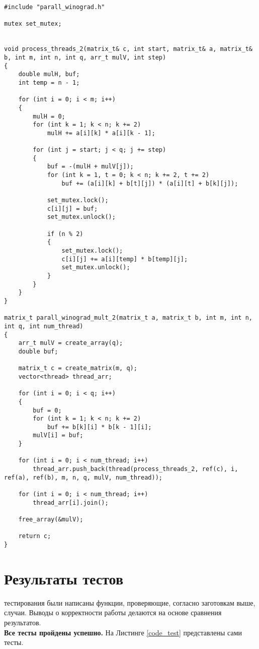 \begin{lstlisting}[label=code3, caption = Распараллеленный алгоритм Винограда (2 вариант), captionpos=b]
#include "parall_winograd.h"

mutex set_mutex;


void process_threads_2(matrix_t& c, int start, matrix_t& a, matrix_t& b, int m, int n, int q, arr_t mulV, int step)
{
	double mulH, buf;
	int temp = n - 1;
	
	for (int i = 0; i < m; i++)
	{
		mulH = 0;
		for (int k = 1; k < n; k += 2)
			mulH += a[i][k] * a[i][k - 1];
		
		for (int j = start; j < q; j += step)
		{
			buf = -(mulH + mulV[j]);
			for (int k = 1, t = 0; k < n; k += 2, t += 2)
				buf += (a[i][k] + b[t][j]) * (a[i][t] + b[k][j]);
			
			set_mutex.lock();
			c[i][j] = buf;
			set_mutex.unlock();
			
			if (n % 2)
			{
				set_mutex.lock();
				c[i][j] += a[i][temp] * b[temp][j];
				set_mutex.unlock();
			}
		}
	}
}

matrix_t parall_winograd_mult_2(matrix_t a, matrix_t b, int m, int n, int q, int num_thread)
{
	arr_t mulV = create_array(q);
	double buf;
	
	matrix_t c = create_matrix(m, q);
	vector<thread> thread_arr;
	
	for (int i = 0; i < q; i++)
	{
		buf = 0;
		for (int k = 1; k < n; k += 2)
			buf += b[k][i] * b[k - 1][i];
		mulV[i] = buf;
	}
	
	for (int i = 0; i < num_thread; i++)
		thread_arr.push_back(thread(process_threads_2, ref(c), i, ref(a), ref(b), m, n, q, mulV, num_thread));
	
	for (int i = 0; i < num_thread; i++)
		thread_arr[i].join();
	
	free_array(&mulV);
	
	return c;
}
\end{lstlisting}


\section{Результаты тестов}
 тестирования были написаны функции, проверяющие, согласно заготовкам выше, случаи. Выводы о корректности работы делаются на основе сравнения результатов.\\

\textbf{Все тесты пройдены успешно.} На Листинге \ref{code_test} представлены сами тесты.\\

